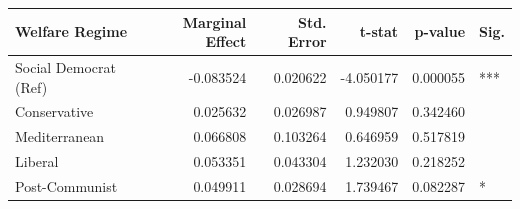 \begin{tabular}{lrrrrl}
\toprule
Welfare Regime & Marginal Effect & Std. Error & t-stat & p-value & Sig. \\
\midrule
Social Democrat (Ref) & -0.083524 & 0.020622 & -4.050177 & 0.000055 & *** \\
Conservative & 0.025632 & 0.026987 & 0.949807 & 0.342460 &  \\
Mediterranean & 0.066808 & 0.103264 & 0.646959 & 0.517819 &  \\
Liberal & 0.053351 & 0.043304 & 1.232030 & 0.218252 &  \\
Post-Communist & 0.049911 & 0.028694 & 1.739467 & 0.082287 & * \\
\bottomrule
\end{tabular}
